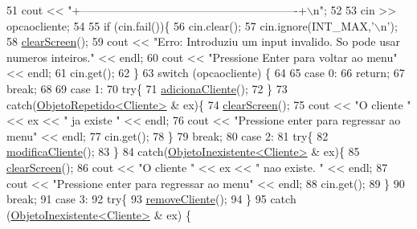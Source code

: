 \begin{DoxyCode}
51         cout << \textcolor{stringliteral}{"+----------------------------------------------------------+\(\backslash\)n"};
52 
53         cin >> opcaocliente;
54 
55         \textcolor{keywordflow}{if} (cin.fail())\{
56             cin.clear();
57             cin.ignore(INT\_MAX,\textcolor{charliteral}{'\(\backslash\)n'});
58             \hyperlink{menu_8h_aceb70c1ed7e11f0863a868704f02214b}{clearScreen}();
59             cout << \textcolor{stringliteral}{"Erro: Introduziu um input invalido. So pode usar numeros inteiros."} << endl;
60             cout << \textcolor{stringliteral}{"Pressione Enter para voltar ao menu"} << endl;
61             cin.get();
62         \}
63         \textcolor{keywordflow}{switch} (opcaocliente) \{
64 
65         \textcolor{keywordflow}{case} 0:
66             \textcolor{keywordflow}{return};
67             \textcolor{keywordflow}{break};
68 
69         \textcolor{keywordflow}{case} 1:
70             \textcolor{keywordflow}{try}\{
71             \hyperlink{classEmpresa_aba4af6a945948ac66e771a416cfc2a2a}{adicionaCliente}();
72             \}
73             \textcolor{keywordflow}{catch}(\hyperlink{classObjetoRepetido}{ObjetoRepetido<Cliente>} & ex)\{
74                 \hyperlink{menu_8h_aceb70c1ed7e11f0863a868704f02214b}{clearScreen}();
75                 cout << \textcolor{stringliteral}{"O cliente "} << ex << \textcolor{stringliteral}{" ja existe "} << endl;
76                 cout << \textcolor{stringliteral}{"Pressione enter para regressar ao menu"} << endl;
77                 cin.get();
78             \}
79             \textcolor{keywordflow}{break};
80         \textcolor{keywordflow}{case} 2:
81             \textcolor{keywordflow}{try}\{
82             \hyperlink{classEmpresa_a9b938f2436e95e68afce6cc04f2100bc}{modificaCliente}();
83             \}
84             \textcolor{keywordflow}{catch}(\hyperlink{classObjetoInexistente}{ObjetoInexistente<Cliente>} & ex)\{
85                 \hyperlink{menu_8h_aceb70c1ed7e11f0863a868704f02214b}{clearScreen}();
86                 cout << \textcolor{stringliteral}{"O cliente "} << ex << \textcolor{stringliteral}{" nao existe. "} << endl;
87                 cout << \textcolor{stringliteral}{"Pressione enter para regressar ao menu"} << endl;
88                 cin.get();
89             \}
90             \textcolor{keywordflow}{break};
91         \textcolor{keywordflow}{case} 3:
92             \textcolor{keywordflow}{try}\{
93             \hyperlink{classEmpresa_ab9af9446d6d2c206b4b3e18e1bcb6475}{removeCliente}();
94             \}
95             \textcolor{keywordflow}{catch} (\hyperlink{classObjetoInexistente}{ObjetoInexistente<Cliente>} & ex) \{

\end{DoxyCode}
